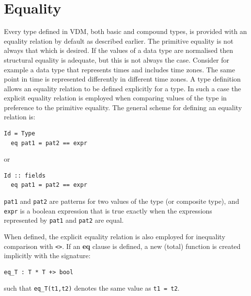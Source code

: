 \documentclass{overturerepchap}
\newcommand{\keyw}[1]{{\bf\ttfamily #1}}
\begin{document}
\section{Equality}\label{eq}
Every type defined in VDM, both basic and compound types, is provided with an equality relation by default as described earlier.
The primitive equality is not always that which is desired.
If the values of a data type are normalised then structural equality is adequate, but this is not always the case.
Consider for example a data type that represents times and includes time zones.
The same point in time is represented differently in different time zones.
A type definition allows an equality relation to be defined explicitly for a type.
In such a case the explicit equality relation is employed when comparing values of the type in preference to the primitive equality.
The general scheme for defining an equality relation is:
\begin{lstlisting}
Id = Type
  eq pat1 = pat2 == expr
\end{lstlisting}
or
\begin{lstlisting}
Id :: fields
  eq pat1 = pat2 == expr
\end{lstlisting}
{\tt pat1} and {\tt pat2} are patterns for two values of the type (or composite type), and {\tt expr} is a boolean expression that is true exactly when the expressions represented by {\tt pat1} and {\tt pat2} are equal.

When defined, the explicit equality relation is also employed for inequality comparison with {\tt <>}.
If an \keyw{eq} clause is defined, a new (total) function is created implicitly with the signature:
\begin{lstlisting}
eq_T : T * T +> bool
\end{lstlisting}
such that {\tt eq\_T(t1,t2)} denotes the same value as {\tt t1 = t2}.
\end{document}
